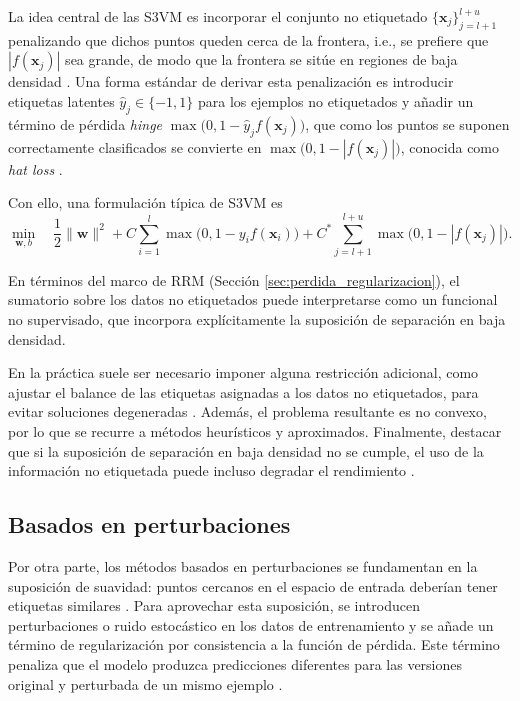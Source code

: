La idea central de las \gls{S3VM} es incorporar el conjunto no etiquetado $\{\mathbf{x}_j\}_{j=l+1}^{l+u}$ penalizando que dichos puntos queden cerca de la frontera, i.e., se prefiere que $|f(\mathbf{x}_j)|$ sea grande, de modo que la frontera se sitúe en regiones de baja densidad \cite{van2020survey,10.7551/mitpress/9780262033589.001.0001}. Una forma estándar de derivar esta penalización es introducir etiquetas latentes $\hat{y}_j\in\{-1,1\}$ para los ejemplos no etiquetados y añadir un término de pérdida \textit{hinge} $\max\bigl(0,1-\hat{y}_j f(\mathbf{x}_j)\bigr)$, que como los puntos se suponen correctamente clasificados se convierte en $\max\bigl(0,1-|f(\mathbf{x}_j)|\bigr)$, conocida como \textit{hat loss} \cite{10.7551/mitpress/9780262033589.001.0001}.

Con ello, una formulación típica de \gls{S3VM} es
\begin{equation}
\min_{\mathbf{w},b} \quad \frac{1}{2}\|\mathbf{w}\|^2 + C \sum_{i=1}^l \max\bigl(0, 1 - y_i f(\mathbf{x}_i)\bigr) + C^* \sum_{j=l+1}^{l+u} \max\bigl(0, 1 - |f(\mathbf{x}_j)|\bigr).
\end{equation}

En términos del marco de \gls{RRM} (Sección \ref{sec:perdida_regularizacion}), el sumatorio sobre los datos no etiquetados puede interpretarse como un funcional no supervisado, que incorpora explícitamente la suposición de separación en baja densidad.

En la práctica suele ser necesario imponer alguna restricción adicional, como ajustar el balance de las etiquetas asignadas a los datos no etiquetados, para evitar soluciones degeneradas \cite{van2020survey}. Además, el problema resultante es no convexo, por lo que se recurre a métodos heurísticos y aproximados. Finalmente, destacar que si la suposición de separación en baja densidad no se cumple, el uso de la información no etiquetada puede incluso degradar el rendimiento \cite{van2020survey}.

\subsection{Basados en perturbaciones}
Por otra parte, los métodos basados en perturbaciones se fundamentan en la suposición de suavidad: puntos cercanos en el espacio de entrada deberían tener etiquetas similares \cite{10.7551/mitpress/9780262033589.001.0001}. Para aprovechar esta suposición, se introducen perturbaciones o ruido estocástico en los datos de entrenamiento y se añade un término de regularización por consistencia a la función de pérdida. Este término penaliza que el modelo produzca predicciones diferentes para las versiones original y perturbada de un mismo ejemplo \cite{van2020survey}.

